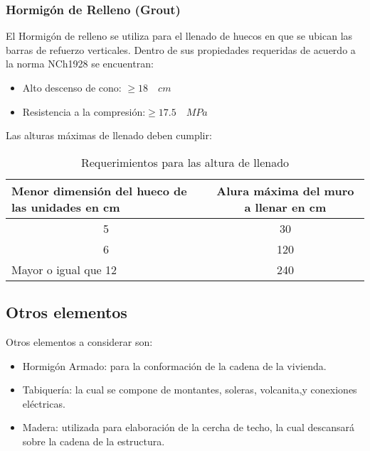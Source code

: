         \subsubsection{Hormigón de Relleno (Grout)}
        El Hormigón de relleno se utiliza para el llenado de huecos en que se ubican las barras de refuerzo verticales.
        Dentro de sus propiedades requeridas de acuerdo a la norma NCh1928 se encuentran:
        \begin{itemize}
            \item Alto descenso de cono: $\geq 18 \quad cm$
            \item Resistencia a la compresión:$\geq 17.5 \quad MPa$
        \end{itemize}
        
        Las alturas máximas de llenado deben cumplir:
        \begin{table}[H]
          \centering
          \caption{Requerimientos para las altura de llenado}
          \begin{tabular}{|p{10.28em}|c|}
            \hline
            \textbf{Menor dimensión del hueco de las unidades en cm} &
              \multicolumn{1}{p{9.11em}|}{\textbf{Alura máxima del muro a llenar en cm}}
              \bigstrut\\
            \hline
            \multicolumn{1}{|c|}{5} &
              30
              \bigstrut[t]\\
            \multicolumn{1}{|c|}{6} &
              120
              \\
            Mayor o igual que 12 &
              240
              \bigstrut[b]\\
            \hline
          \end{tabular}
          \label{tab:dasd}
        \end{table}
            
    \subsection{Otros elementos}
    Otros elementos a considerar son:
    \begin{itemize}
        \item Hormigón Armado: para la conformación de la cadena de la vivienda.
        \item Tabiquería: la cual se compone de montantes, soleras, volcanita,y conexiones eléctricas.
        \item Madera: utilizada para elaboración de la cercha de techo, la cual descansará sobre la cadena de la estructura.
    \end{itemize}
    
